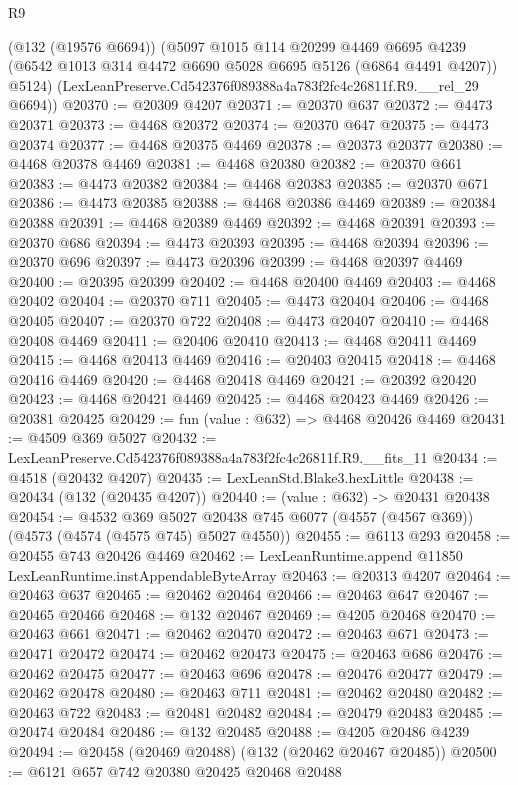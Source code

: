 \begin{lexlean}{R9}
\begin{coremodule}
      (@132 (@19576 @6694))
      (@5097
        @1015
        @114
        @20299
        @4469
        @6695
        @4239
        (@6542 @1013 @314 @4472 @6690 @5028 @6695 @5126 (@6864 @4491 @4207))
        @5124)
      (LexLeanPreserve.Cd542376f089388a4a783f2fc4c26811f.R9.__rel_29 @6694))
@20370 := @20309 @4207
@20371 := @20370 @637
@20372 := @4473 @20371
@20373 := @4468 @20372
@20374 := @20370 @647
@20375 := @4473 @20374
@20377 := @4468 @20375 @4469
@20378 := @20373 @20377
@20380 := @4468 @20378 @4469
@20381 := @4468 @20380
@20382 := @20370 @661
@20383 := @4473 @20382
@20384 := @4468 @20383
@20385 := @20370 @671
@20386 := @4473 @20385
@20388 := @4468 @20386 @4469
@20389 := @20384 @20388
@20391 := @4468 @20389 @4469
@20392 := @4468 @20391
@20393 := @20370 @686
@20394 := @4473 @20393
@20395 := @4468 @20394
@20396 := @20370 @696
@20397 := @4473 @20396
@20399 := @4468 @20397 @4469
@20400 := @20395 @20399
@20402 := @4468 @20400 @4469
@20403 := @4468 @20402
@20404 := @20370 @711
@20405 := @4473 @20404
@20406 := @4468 @20405
@20407 := @20370 @722
@20408 := @4473 @20407
@20410 := @4468 @20408 @4469
@20411 := @20406 @20410
@20413 := @4468 @20411 @4469
@20415 := @4468 @20413 @4469
@20416 := @20403 @20415
@20418 := @4468 @20416 @4469
@20420 := @4468 @20418 @4469
@20421 := @20392 @20420
@20423 := @4468 @20421 @4469
@20425 := @4468 @20423 @4469
@20426 := @20381 @20425
@20429 := fun (value : @632) => @4468 @20426 @4469
@20431 := @4509 @369 @5027
@20432 := LexLeanPreserve.Cd542376f089388a4a783f2fc4c26811f.R9.__fits_11
@20434 := @4518 (@20432 @4207)
@20435 := LexLeanStd.Blake3.hexLittle
@20438 := @20434 (@132 (@20435 @4207))
@20440 := (value : @632) -> @20431 @20438
@20454 := @4532
    @369
    @5027
    @20438
    @745
    @6077
    (@4557 (@4567 @369))
    (@4573 (@4574 (@4575 @745) @5027 @4550))
@20455 := @6113 @293
@20458 := @20455 @743 @20426 @4469
@20462 := LexLeanRuntime.append @11850 LexLeanRuntime.instAppendableByteArray
@20463 := @20313 @4207
@20464 := @20463 @637
@20465 := @20462 @20464
@20466 := @20463 @647
@20467 := @20465 @20466
@20468 := @132 @20467
@20469 := @4205 @20468
@20470 := @20463 @661
@20471 := @20462 @20470
@20472 := @20463 @671
@20473 := @20471 @20472
@20474 := @20462 @20473
@20475 := @20463 @686
@20476 := @20462 @20475
@20477 := @20463 @696
@20478 := @20476 @20477
@20479 := @20462 @20478
@20480 := @20463 @711
@20481 := @20462 @20480
@20482 := @20463 @722
@20483 := @20481 @20482
@20484 := @20479 @20483
@20485 := @20474 @20484
@20486 := @132 @20485
@20488 := @4205 @20486 @4239
@20494 := @20458 (@20469 @20488) (@132 (@20462 @20467 @20485))
@20500 := @6121 @657 @742 @20380 @20425 @20468 @20488

\end{coremodule}
\end{lexlean}
